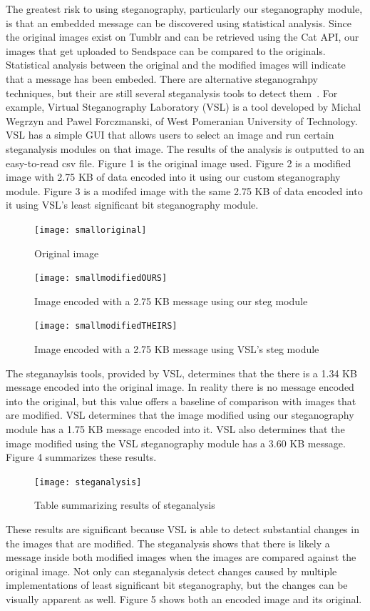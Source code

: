 The greatest risk to using steganography, particularly our steganography module, is that an embedded message can be discovered using statistical analysis. Since the original images exist on Tumblr and can be retrieved using the Cat API, our images that get uploaded to Sendspace can be compared to the originals. Statistical analysis between the original and the modified images will indicate that a message has been embeded. There are alternative steganograhpy techniques, but their are still several steganalysis tools to detect them~\cite{Laden}. For example, Virtual Steganography Laboratory (VSL) is a tool developed by Michal Wegrzyn and Pawel Forczmanski, of West Pomeranian University of Technology. VSL has a simple GUI that allows users to select an image and run certain steganalysis modules on that image. The results of the analysis is outputted to an easy-to-read csv file. Figure 1 is the original image used. Figure 2 is a modified image with 2.75 KB of data encoded into it using our custom steganography module. Figure 3 is a modifed image with the same 2.75 KB of data encoded into it using VSL's least significant bit steganography module.
\begin{figure}[h]
	\texttt{[image: smalloriginal]}
	\caption{Original image}
\end{figure}
\begin{figure}[h]
	\texttt{[image: smallmodifiedOURS]}
	\caption{Image encoded with a 2.75 KB message using our steg module}
\end{figure}
\begin{figure}[h]
	\texttt{[image: smallmodifiedTHEIRS]}
	\caption{Image encoded with a 2.75 KB message using VSL's steg module}
\end{figure}
The steganaylsis tools, provided by VSL, determines that the there is a 1.34 KB message encoded into the original image. In reality there is no message encoded into the original, but this value offers a baseline of comparison with images that are modified. VSL determines that the image modified using our steganography module has a 1.75 KB message encoded into it. VSL also determines that the image modified using the VSL steganography module has a 3.60 KB message. Figure 4 summarizes these results.
\begin{figure}[h]
	\texttt{[image: steganalysis]}
	\caption{Table summarizing results of steganalysis}
\end{figure}
These results are significant because VSL is able to detect substantial changes in the images that are modified. The steganalysis shows that there is likely a message inside both modified images when the images are compared against the original image. Not only can steganalysis detect changes caused by multiple implementations of least significant bit steganography, but the changes can be visually apparent as well. Figure 5 shows both an encoded image and its original.
